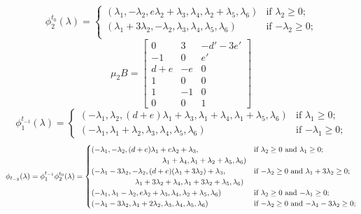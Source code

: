\documentclass{amsart}
\numberwithin{theorem}{section}
\begin{document}
  \[
    \phi^{t_0}_2(\lambda)
    =
    \begin{cases} 
      (\lambda_1,-\lambda_2,e\lambda_2+\lambda_3,\lambda_4,\lambda_2+\lambda_5,\lambda_6) & \text{if $\lambda_2 \ge 0$;}\\
      (\lambda_1+3\lambda_2,-\lambda_2,\lambda_3,\lambda_4,\lambda_5,\lambda_6) & \text{if $-\lambda_2 \ge 0$;}\\
    \end{cases}
  \]
  \[
    \mu_2 B=\left[\begin{array}{ccc} 
    0 & 3 & -d'-3e' \\ 
    -1 & 0 & e'\\ 
    d+e & -e & 0\\ 
    1 & 0 & 0\\ 
    1 & -1 & 0\\ 
    0 & 0 & 1
    \end{array}\right]
  \]
  \[
    \phi^{t_{-1}}_1(\lambda)
    =
    \begin{cases} 
      (-\lambda_1,\lambda_2,(d+e)\lambda_1+\lambda_3,\lambda_1+\lambda_4,\lambda_1+\lambda_5,\lambda_6) & \text{if $\lambda_1 \ge 0$;}\\
      (-\lambda_1,\lambda_1+\lambda_2,\lambda_3,\lambda_4,\lambda_5,\lambda_6) & \text{if $-\lambda_1 \ge 0$;}
    \end{cases}
  \]
  \[
    \phi_{t_{-2}}(\lambda)=\phi^{t_{-1}}_1\phi^{t_0}_2(\lambda)
    =
    \begin{cases}
      (-\lambda_1,-\lambda_2,(d+e)\lambda_1+e\lambda_2+\lambda_3, & \text{if $\lambda_2 \ge 0$ and $\lambda_1 \ge 0$;}\\
      \hspace{1.3in} \lambda_1+\lambda_4,\lambda_1+\lambda_2+\lambda_5,\lambda_6) & \\
      (-\lambda_1-3\lambda_2,-\lambda_2,(d+e)(\lambda_1+3\lambda_2)+\lambda_3, & \text{if $-\lambda_2 \ge 0$ and $\lambda_1+3\lambda_2 \ge 0$;}\\
      \hspace{0.8in} \lambda_1+3\lambda_2+\lambda_4,\lambda_1+3\lambda_2+\lambda_5,\lambda_6) & \\
      (-\lambda_1,\lambda_1-\lambda_2,e\lambda_2+\lambda_3,\lambda_4,\lambda_2+\lambda_5,\lambda_6) & \text{if $\lambda_2 \ge 0$ and $-\lambda_1 \ge 0$;}\\
      (-\lambda_1-3\lambda_2,\lambda_1+2\lambda_2,\lambda_3,\lambda_4,\lambda_5,\lambda_6) & \text{if $-\lambda_2 \ge 0$ and $-\lambda_1-3\lambda_2 \ge 0$;}\\
    \end{cases}
  \]
\end{document}
